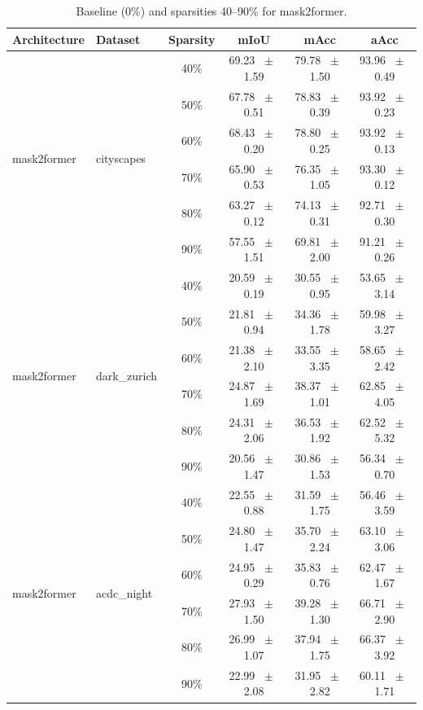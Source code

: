 \begin{table}[h]
  \centering
  \caption{Baseline (0\%) and sparsities 40--90\% for mask2former.}
  \begin{tabular}{@{}l l c c c c@{}}
    \toprule
    Architecture & Dataset & Sparsity & mIoU & mAcc & aAcc \\
    \midrule
    \multirow{6}{*}{mask2former} & \multirow{6}{*}{cityscapes} & 40\% & 69.23 ~$\pm$~ 1.59 & 79.78 ~$\pm$~ 1.50 & 93.96 ~$\pm$~ 0.49 \\
    & & 50\% & 67.78 ~$\pm$~ 0.51 & 78.83 ~$\pm$~ 0.39 & 93.92 ~$\pm$~ 0.23 \\
    & & 60\% & 68.43 ~$\pm$~ 0.20 & 78.80 ~$\pm$~ 0.25 & 93.92 ~$\pm$~ 0.13 \\
    & & 70\% & 65.90 ~$\pm$~ 0.53 & 76.35 ~$\pm$~ 1.05 & 93.30 ~$\pm$~ 0.12 \\
    & & 80\% & 63.27 ~$\pm$~ 0.12 & 74.13 ~$\pm$~ 0.31 & 92.71 ~$\pm$~ 0.30 \\
    & & 90\% & 57.55 ~$\pm$~ 1.51 & 69.81 ~$\pm$~ 2.00 & 91.21 ~$\pm$~ 0.26 \\
    \midrule
    \multirow{6}{*}{mask2former} & \multirow{6}{*}{dark_zurich} & 40\% & 20.59 ~$\pm$~ 0.19 & 30.55 ~$\pm$~ 0.95 & 53.65 ~$\pm$~ 3.14 \\
    & & 50\% & 21.81 ~$\pm$~ 0.94 & 34.36 ~$\pm$~ 1.78 & 59.98 ~$\pm$~ 3.27 \\
    & & 60\% & 21.38 ~$\pm$~ 2.10 & 33.55 ~$\pm$~ 3.35 & 58.65 ~$\pm$~ 2.42 \\
    & & 70\% & 24.87 ~$\pm$~ 1.69 & 38.37 ~$\pm$~ 1.01 & 62.85 ~$\pm$~ 4.05 \\
    & & 80\% & 24.31 ~$\pm$~ 2.06 & 36.53 ~$\pm$~ 1.92 & 62.52 ~$\pm$~ 5.32 \\
    & & 90\% & 20.56 ~$\pm$~ 1.47 & 30.86 ~$\pm$~ 1.53 & 56.34 ~$\pm$~ 0.70 \\
    \midrule
    \multirow{6}{*}{mask2former} & \multirow{6}{*}{acdc_night} & 40\% & 22.55 ~$\pm$~ 0.88 & 31.59 ~$\pm$~ 1.75 & 56.46 ~$\pm$~ 3.59 \\
    & & 50\% & 24.80 ~$\pm$~ 1.47 & 35.70 ~$\pm$~ 2.24 & 63.10 ~$\pm$~ 3.06 \\
    & & 60\% & 24.95 ~$\pm$~ 0.29 & 35.83 ~$\pm$~ 0.76 & 62.47 ~$\pm$~ 1.67 \\
    & & 70\% & 27.93 ~$\pm$~ 1.50 & 39.28 ~$\pm$~ 1.30 & 66.71 ~$\pm$~ 2.90 \\
    & & 80\% & 26.99 ~$\pm$~ 1.07 & 37.94 ~$\pm$~ 1.75 & 66.37 ~$\pm$~ 3.92 \\
    & & 90\% & 22.99 ~$\pm$~ 2.08 & 31.95 ~$\pm$~ 2.82 & 60.11 ~$\pm$~ 1.71 \\

\end{tabular}
\end{table}
